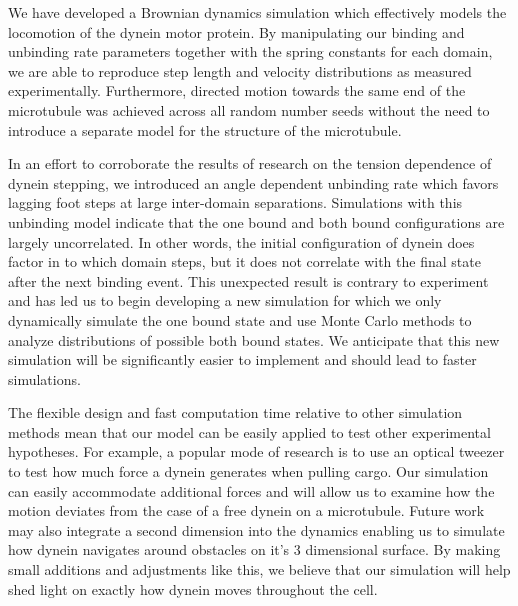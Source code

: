 We have developed a Brownian dynamics simulation which effectively models the locomotion of the dynein motor protein. By manipulating our binding and unbinding rate parameters together with the spring constants for each domain, we are able to reproduce step length and velocity distributions as measured experimentally. Furthermore, directed motion towards the same end of the microtubule was achieved across all random number seeds without the need to introduce a separate model for the structure of the microtubule. 

In an effort to corroborate the results of research on the tension dependence of dynein stepping, we introduced an angle dependent unbinding rate which favors lagging foot steps at large inter-domain separations. Simulations with this unbinding model indicate that the one bound and both bound configurations are largely uncorrelated. In other words, the initial configuration of dynein does factor in to which domain steps, but it does not correlate with the final state after the next binding event. This unexpected result is contrary to experiment and has led us to begin developing a new simulation for which we only dynamically simulate the one bound state and use Monte Carlo methods to analyze distributions of possible both bound states. We anticipate that this new simulation will be significantly easier to implement and should lead to faster simulations. 


The flexible design and fast computation time relative to other simulation methods mean that our model can be easily applied to test other experimental hypotheses. For example, a popular mode of research is to use an optical tweezer to test how much force a dynein generates when pulling cargo. Our simulation can easily accommodate additional forces and will allow us to examine how the motion deviates from the case of a free dynein on a microtubule. Future work may also integrate a second dimension into the dynamics enabling us to simulate how dynein navigates around obstacles on it's 3 dimensional surface. By making small additions and adjustments like this, we believe that our simulation will help shed light on exactly how dynein moves throughout the cell. 